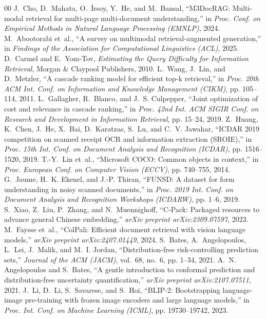 \documentclass[conference]{IEEEtran}
\begin{document}
\begin{thebibliography}{00}
J.~Cho, D.~Mahata, O.~{\.I}rsoy, Y.~He, and M.~Bansal, ``M3DocRAG: Multi-modal retrieval for multi-page multi-document understanding,'' in \emph{Proc. Conf. on Empirical Methods in Natural Language Processing (EMNLP)}, 2024.
M.~Abootorabi et~al., ``A survey on multimodal retrieval-augmented generation,'' in \emph{Findings of the Association for Computational Linguistics (ACL)}, 2025.
D.~Carmel and E.~Yom-Tov, \emph{Estimating the Query Difficulty for Information Retrieval}, Morgan \& Claypool Publishers, 2010.
L.~Wang, J.~Lin, and D.~Metzler, ``A cascade ranking model for efficient top-k retrieval,'' in \emph{Proc. 20th ACM Int. Conf. on Information and Knowledge Management (CIKM)}, pp. 105--114, 2011.
L.~Gallagher, R.~Blanco, and J.~S. Culpepper, ``Joint optimization of cost and relevance in cascade ranking,'' in \emph{Proc. 42nd Int. ACM SIGIR Conf. on Research and Development in Information Retrieval}, pp. 15--24, 2019.
Z.~Huang, K.~Chen, J.~He, X.~Bai, D.~Karatzas, S.~Lu, and C.~V. Jawahar, ``ICDAR 2019 competition on scanned receipt OCR and information extraction (SROIE),'' in \emph{Proc. 15th Int. Conf. on Document Analysis and Recognition (ICDAR)}, pp. 1516--1520, 2019.
T.-Y.~Lin et~al., ``Microsoft COCO: Common objects in context,'' in \emph{Proc. European Conf. on Computer Vision (ECCV)}, pp. 740--755, 2014.
G.~Jaume, H.~K. Ekenel, and J.-P. Thiran, ``FUNSD: A dataset for form understanding in noisy scanned documents,'' in \emph{Proc. 2019 Int. Conf. on Document Analysis and Recognition Workshops (ICDARW)}, pp. 1--6, 2019.
S.~Xiao, Z.~Liu, P.~Zhang, and N.~Muennighoff, ``C-Pack: Packaged resources to advance general Chinese embedding,'' \emph{arXiv preprint arXiv:2309.07597}, 2023.
M.~Faysse et~al., ``ColPali: Efficient document retrieval with vision language models,'' \emph{arXiv preprint arXiv:2407.01449}, 2024.
S.~Bates, A.~Angelopoulos, L.~Lei, J.~Malik, and M.~I. Jordan, ``Distribution-free risk-controlling prediction sets,'' \emph{Journal of the ACM (JACM)}, vol.~68, no.~6, pp. 1--34, 2021.
A.~N. Angelopoulos and S.~Bates, ``A gentle introduction to conformal prediction and distribution-free uncertainty quantification,'' \emph{arXiv preprint arXiv:2107.07511}, 2021.
J.~Li, D.~Li, S.~Savarese, and S.~Hoi, ``BLIP-2: Bootstrapping language-image pre-training with frozen image encoders and large language models,'' in \emph{Proc. Int. Conf. on Machine Learning (ICML)}, pp. 19730--19742, 2023.

\end{thebibliography}
\end{document}
